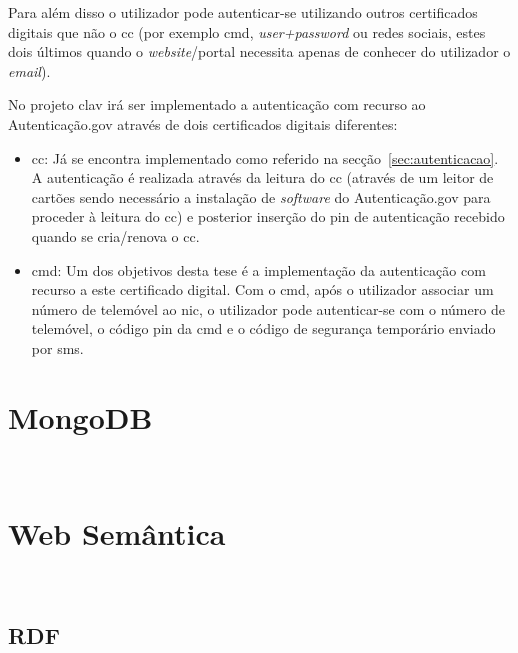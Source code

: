 Para além disso o utilizador pode autenticar-se utilizando outros certificados digitais que não o \acrshort{cc} (por exemplo \acrfull{cmd}, \textit{user+password} ou redes sociais, estes dois últimos quando o \textit{website}/portal necessita apenas de conhecer do utilizador o \textit{email}).

No projeto \acrshort{clav} irá ser implementado a autenticação com recurso ao Autenticação.gov através de dois certificados digitais diferentes:
\begin{itemize}
    \item \acrfull{cc}: Já se encontra implementado como referido na secção~\ref{sec:autenticacao}. A autenticação é realizada através da leitura do \acrshort{cc} (através de um leitor de cartões sendo necessário a instalação de \textit{software} do Autenticação.gov para proceder à leitura do \acrshort{cc}) e posterior inserção do \acrshort{pin} de autenticação recebido quando se cria/renova o \acrshort{cc}.
    \item \acrfull{cmd}: Um dos objetivos desta tese é a implementação da autenticação com recurso a este certificado digital. Com o \acrshort{cmd}, após o utilizador associar um número de telemóvel ao \acrshort{nic}, o utilizador pode autenticar-se com o número de telemóvel, o código \acrshort{pin} da \acrshort{cmd} e o código de segurança temporário enviado por \acrshort{sms}.
\end{itemize}



\section{MongoDB}
~\cite{wdmongo}


\section{Web Semântica}
~\cite{lsparql}

\subsection{RDF}
~\cite{lsparql}


